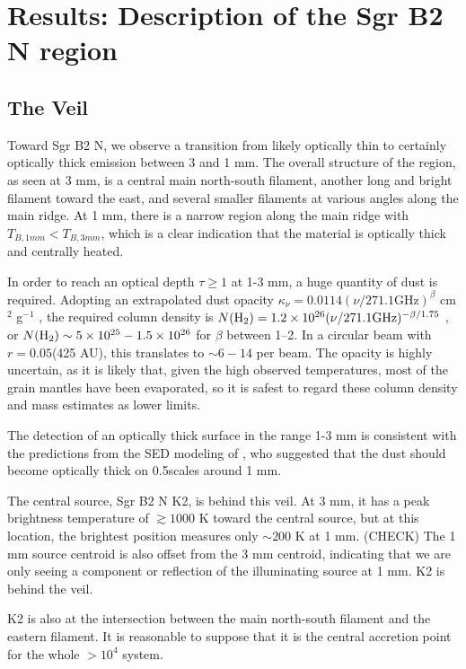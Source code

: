 \documentclass[twocolumn]{aastex61}
\begin{document}
\section{Results: Description of the Sgr B2 N region}
\subsection{The Veil}
\label{sec:theveil}
Toward Sgr B2 N, we observe a transition from likely optically thin to
certainly optically thick emission between 3 and 1 mm.  The overall structure
of the region, as seen at 3 mm, is a central main north-south filament, another
long and bright filament toward the east, and several smaller filaments at
various angles along the main ridge.  At 1 mm, there is a narrow region along
the main ridge with $T_{B,1 mm} < T_{B,3 mm}$, which is a clear indication
that the material is optically thick and centrally heated.

In order to reach an optical depth $\tau\geq1$ at 1-3 mm, a huge quantity of
dust is required.  Adopting an extrapolated dust opacity $\kappa_\nu = 0.0114
(\nu/271.1 \mathrm{GHz})^{\beta}$ cm$^2$ g$^{-1}$ \citep{Aguirre2011a}, the required column density is
$N(\textrm{H}_{2}) = 1.2\times10^{26} (\nu/271.1 \mathrm{GHz})^{-\beta/1.75}$ \persc, or $N(\textrm{H}_{2}) \sim
5\times10^{25} - 1.5\times10^{26}$ \persc for $\beta$ between 1--2.  In a circular beam with $r=0.05$\arcsec (425 AU),
this translates to $\sim6-14$ \msun per beam.  The opacity is highly uncertain,
as it is likely that, given the high observed temperatures, most of the grain
mantles have been evaporated, so it is safest to regard these column density
and mass estimates as lower limits.

The detection of an optically thick surface in the range 1-3 mm is consistent
with the predictions from the SED modeling of \citet{Schmiedeke2016a}, who
suggested that the dust should become optically thick on 0.5\arcsec scales
around 1 mm.

The central source, Sgr B2 N K2, is behind this veil.  At 3 mm, it has a peak
brightness temperature of $\gtrsim1000$ K toward the central source, but at this
location, the brightest position measures only $\sim200$ K at 1 mm.  (CHECK) The 1 mm 
source centroid is also offset from the 3 mm centroid, indicating that we are
only seeing a component or reflection of the illuminating source at 1 mm.
K2 is behind the veil.

K2 is also at the intersection between the main north-south filament and the
eastern filament.  It is reasonable to suppose that it is the central
accretion point for the whole $>10^4$ \msun system.
\end{document}
